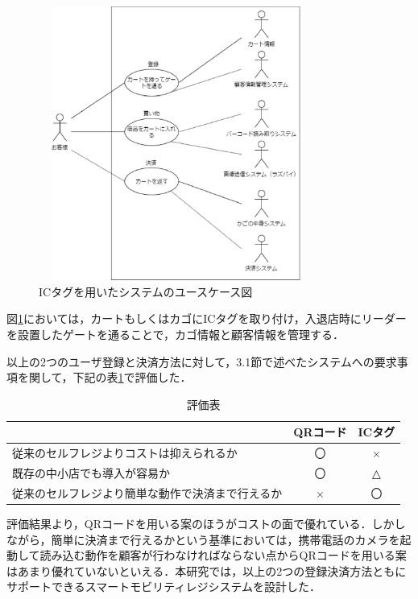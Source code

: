 \begin{figure}[htbp]
\centering
\includegraphics[height = 9cm,width = 9cm]{./picture/usecase_ic.eps}
\caption{ICタグを用いたシステムのユースケース図}
\label{usecase_ic}
\end{figure}

図\ref{usecase_ic}においては，カートもしくはカゴにICタグを取り付け，入退店時にリーダーを設置したゲートを通ることで，カゴ情報と顧客情報を管理する．


以上の2つのユーザ登録と決済方法に対して，3.1節で述べたシステムへの要求事項を関して，下記の表\ref{test}で評価した．


\begin{table}[htb]
\begin{center}
\caption{評価表}
\begin{tabular}{|l||c|c|} \hline
 & QRコード & ICタグ \\ \hline \hline
従来のセルフレジよりコストは抑えられるか & 〇 & × \\
既存の中小店でも導入が容易か & 〇 & △ \\
従来のセルフレジより簡単な動作で決済まで行えるか & × & 〇 \\ \hline
\end{tabular}
\label{test}
  \end{center}
\end{table}


評価結果より，QRコードを用いる案のほうがコストの面で優れている．しかしながら，簡単に決済まで行えるかという基準においては，携帯電話のカメラを起動して読み込む動作を顧客が行わなければならない点からQRコードを用いる案はあまり優れていないといえる．本研究では，以上の2つの登録決済方法ともにサポートできるスマートモビリティレジシステムを設計した．

